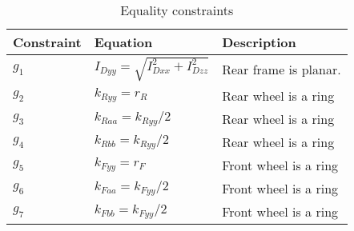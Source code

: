\documentclass{bmd2019a}
\begin{document}
\begin{table}
  \caption{Equality constraints}
  \begin{tabular}{lll}
    \toprule
    Constraint & Equation & Description \\
    \midrule
    $g_1$ & $I_{Dyy} = \sqrt{I_{Dxx}^2 + I_{Dzz}^2}$ & Rear frame is planar. \\
    $g_2$ & $k_{Ryy} = r_R$  & Rear wheel is a ring \\
    $g_3$ & $k_{Raa} = k_{Ryy}/2$ & Rear wheel is a ring \\
    $g_4$ & $k_{Rbb} = k_{Ryy}/2$ & Rear wheel is a ring \\
    $g_5$ & $k_{Fyy} = r_F$  & Front wheel is a ring \\
    $g_6$ & $k_{Faa} = k_{Fyy}/2$ & Front wheel is a ring \\
    $g_7$ & $k_{Fbb} = k_{Fyy}/2$ & Front wheel is a ring \\
    \bottomrule
  \end{tabular}
\end{table}
\end{document}
